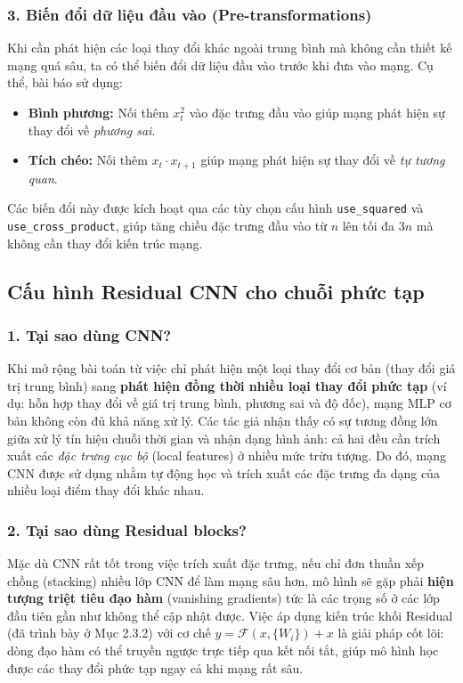\subsubsection*{3. Biến đổi dữ liệu đầu vào (Pre-transformations)}
Khi cần phát hiện các loại thay đổi khác ngoài trung bình mà không cần thiết kế mạng quá sâu, 
ta có thể biến đổi dữ liệu đầu vào trước khi đưa vào mạng. Cụ thể, bài báo sử dụng:
\begin{itemize}
    \item \textbf{Bình phương:} Nối thêm $x_t^2$ vào đặc trưng đầu vào giúp mạng phát hiện sự thay đổi về \textit{phương sai}.
    \item \textbf{Tích chéo:} Nối thêm $x_t \cdot x_{t+1}$ giúp mạng phát hiện sự thay đổi về \textit{tự tương quan}.
\end{itemize}
Các biến đổi này được kích hoạt qua các tùy chọn cấu hình \texttt{use\_squared} và \texttt{use\_cross\_product}, giúp tăng chiều đặc trưng đầu vào từ $n$ lên tối đa $3n$ mà không cần thay đổi kiến trúc mạng.

\subsection{Cấu hình Residual CNN cho chuỗi phức tạp}

\subsubsection*{1. Tại sao dùng CNN?}
Khi mở rộng bài toán từ việc chỉ phát hiện một loại thay đổi cơ bản 
(thay đổi giá trị trung bình) sang \textbf{phát hiện đồng thời nhiều loại thay đổi phức tạp} 
(ví dụ: hỗn hợp thay đổi về giá trị trung bình, phương sai và độ dốc), 
mạng MLP cơ bản không còn đủ khả năng xử lý. Các tác giả nhận thấy có sự tương đồng 
lớn giữa xử lý tín hiệu chuỗi thời gian và nhận dạng hình ảnh: cả hai đều cần trích xuất
 các \textit{đặc trưng cục bộ} (local features) ở nhiều mức trừu tượng. 
 Do đó, mạng CNN được sử dụng nhằm tự động học và trích xuất các đặc trưng đa 
 dạng của nhiều loại điểm thay đổi khác nhau.


\subsubsection*{2. Tại sao dùng Residual blocks?}
Mặc dù CNN rất tốt trong việc trích xuất đặc trưng, nếu chỉ đơn thuần xếp chồng 
(stacking) nhiều lớp CNN để làm mạng sâu hơn, mô hình sẽ gặp phải \textbf{hiện tượng triệt tiêu đạo hàm} 
(vanishing gradients) tức là các trọng số ở các lớp đầu tiên gần như không thể cập nhật được. 
Việc áp dụng kiến trúc khối Residual (đã trình bày ở Mục 2.3.2) với cơ chế 
$y = \mathcal{F}(x, \{W_i\}) + x$ là giải pháp cốt lõi: dòng đạo hàm có thể truyền ngược trực tiếp
 qua kết nối tắt, giúp mô hình học được các thay đổi phức tạp ngay cả khi mạng rất sâu.

